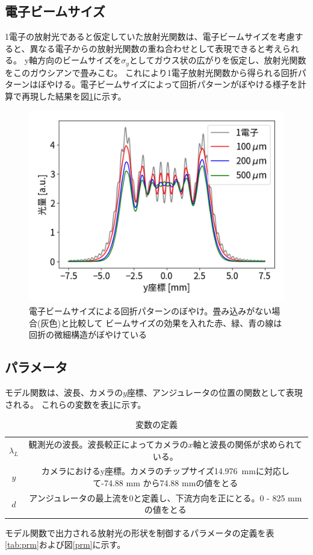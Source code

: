 \documentclass[a4paper,11pt,uplatex]{jsbook}
\begin{document}
\subsection{電子ビームサイズ}
1電子の放射光であると仮定していた放射光関数は、電子ビームサイズを考慮すると、異なる電子からの放射光関数の重ね合わせとして表現できると考えられる。
y軸方向のビームサイズを$\sigma_y$としてガウス状の広がりを仮定し、放射光関数をこのガウシアンで畳みこむ。
これにより1電子放射光関数から得られる回折パターンはぼやける。電子ビームサイズによって回折パターンがぼやける様子を計算で再現した結果を図\ref{beamsize}に示す。
\begin{figure}
  \centering
  \includegraphics[width=0.8\linewidth]{image/4-esize.png}
  \caption[電子ビームサイズによる回折パターンのぼやけ]{電子ビームサイズによる回折パターンのぼやけ。畳み込みがない場合(灰色)と比較して
  ビームサイズの効果を入れた赤、緑、青の線は回折の微細構造がぼやけている}\label{beamsize}
\end{figure}

\subsection{パラメータ}
モデル関数は、波長、カメラの$y$座標、アンジュレータの位置の関数として表現される。
これらの変数を表\ref{tab:variables}に示す。
\begin{table}[h]
  \centering
  \begin{tabular}{c|c}
    $\lambda_L$ & 観測光の波長。波長較正によってカメラの$x$軸と波長の関係が求められている。\\
    $y$ & カメラにおけるy座標。カメラのチップサイズ14.976~mmに対応して-74.88 mm から74.88 mmの値をとる\\
    $d$ & アンジュレータの最上流を0と定義し、下流方向を正にとる。0 - 825 mmの値をとる\\
  \end{tabular}
  \caption[変数の定義]{変数の定義}\label{tab:variables}
\end{table}
モデル関数で出力される放射光の形状を制御するパラメータの定義を表\ref{tab:prm}および図\ref{prm}に示す。
\end{document}
